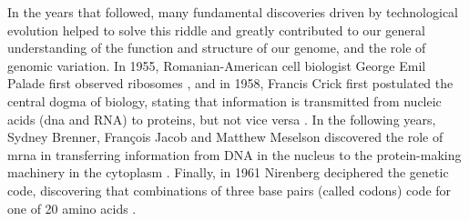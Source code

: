 In the years that followed, many fundamental discoveries driven by technological evolution helped to solve this riddle and greatly contributed to our general understanding of the function and structure of our genome, and the role of genomic variation.
In 1955, Romanian-American cell biologist George Emil Palade first observed ribosomes \cite{palade1955small}, and in 1958, Francis Crick first postulated the central dogma of biology, stating that information is transmitted from nucleic acids (\gls{dna} and RNA) to proteins, but not vice versa \cite{crick1958protein}.
In the following years, Sydney Brenner, François Jacob and Matthew Meselson discovered the role of \gls{mrna} in transferring information from DNA in the nucleus to the protein-making machinery in the cytoplasm \cite{brenner1961unstable}.
Finally, in 1961 Nirenberg deciphered the genetic code, discovering that combinations of three base pairs (called codons) code for one of 20 amino acids
\cite{nirenberg1961dependence, crick1961general, matthaei1962characteristics, yanofsky2007establishing}.
